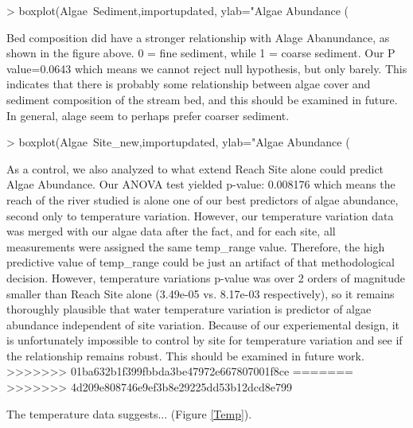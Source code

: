 \documentclass{article}
\begin{document}
\begin{Schunk}
\begin{Sinput}
> boxplot(Algae~Sediment,importupdated, ylab="Algae Abundance (%
\end{Sinput}
\end{Schunk}
Bed composition did have a stronger relationship with Alage Abanundance, as shown in the figure above. 0 = fine sediment, while 1 = coarse sediment. Our P value=0.0643 which means we cannot reject null hypothesis, but only barely. This indicates that there is probably some relationship between algae cover and sediment composition of the stream bed, and this should be examined in future. In general, alage seem to perhaps prefer coarser sediment. 
\begin{Schunk}
\begin{Sinput}
> boxplot(Algae~Site_new,importupdated, ylab="Algae Abundance (%
\end{Sinput}
\end{Schunk}
As a control, we also analyzed to what extend Reach Site alone could predict Algae Abundance. Our ANOVA test yielded p-value: 0.008176 which means the reach of the river studied is alone one of our best predictors of algae abundance, second only to temperature variation. However, our temperature variation data was merged with our algae data after the fact, and for each site, all measurements were assigned the same temp\_range value. Therefore, the high predictive value of temp\_range could be just an artifact of that methodological decision. However, temperature variations p-value was over 2 orders of magnitude smaller than Reach Site alone (3.49e-05 vs. 8.17e-03 respectively), so it remains thoroughly plausible that water temperature variation is predictor of algae abundance independent of site variation. Because of our experiemental design, it is unfortunately impossible to control by site for temperature variation and see if the relationship remains robust. This should be examined in future work. 
>>>>>>> 01ba632b1f399fbbda3be47972e667807001f8ce
=======
>>>>>>> 4d209e808746e9ef3b8e29225dd53b12dcd8e799

The temperature data suggests... (Figure \ref{Temp}).
\end{document}
